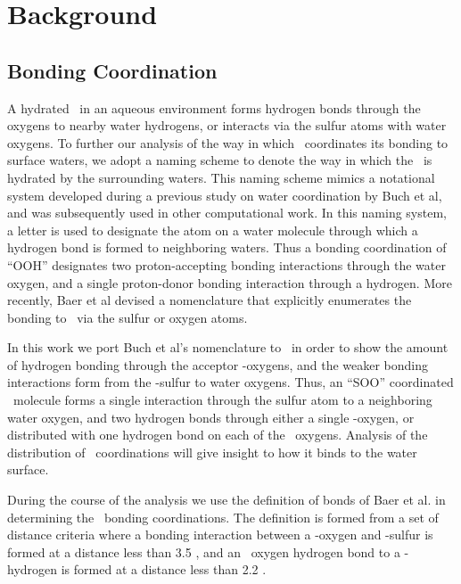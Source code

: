 \section {Background}

\subsection {Bonding Coordination}

A hydrated \suldiox~in an aqueous environment forms hydrogen bonds through the oxygens to nearby water hydrogens, or interacts via the sulfur atoms with water oxygens. To further our analysis of the way in which \suldiox~coordinates its bonding to surface waters, we adopt a naming scheme to denote the way in which the \suldiox~is hydrated by the surrounding waters. This naming scheme mimics a notational system developed during a previous study on water coordination by Buch et al,\cite{Buch 2005} and was subsequently used in other computational work.\cite{Walker2006b} In this naming system, a letter is used to designate the atom on a water molecule through which a hydrogen bond is formed to neighboring waters. Thus a bonding coordination of ``OOH'' designates two proton-accepting bonding interactions through the water oxygen, and a single proton-donor bonding interaction through a hydrogen. More recently, Baer et al devised a nomenclature that explicitly enumerates the bonding to \suldiox~via the sulfur or oxygen atoms.\cite{Baer2010} 

In this work we port Buch et al's nomenclature to \suldiox~in order to show the amount of hydrogen bonding through the acceptor \suldiox-oxygens, and the weaker bonding interactions form from the \suldiox-sulfur to water oxygens. Thus, an ``SOO'' coordinated \suldiox~molecule forms a single interaction through the sulfur atom to a neighboring water oxygen, and two hydrogen bonds through either a single \suldiox-oxygen, or distributed with one hydrogen bond on each of the \suldiox~oxygens. Analysis of the distribution of \suldiox~coordinations will give insight to how it binds to the water surface.

During the course of the analysis we use the definition of bonds of Baer et al. in determining the \suldiox~bonding coordinations.\cite{Baer2010} The definition is formed from a set of distance criteria where a bonding interaction between a \wat-oxygen and \suldiox-sulfur is formed at a distance less than 3.5 \angs, and an \suldiox~oxygen hydrogen bond to a \wat-hydrogen is formed at a distance less than 2.2 \angs.


